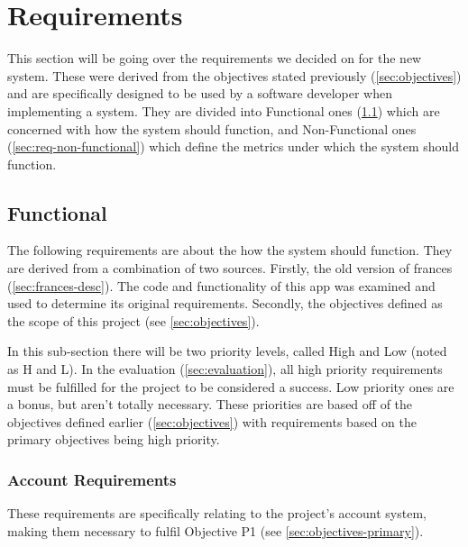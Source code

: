 \documentclass[12pt, letterpaper]{article}
\begin{document}
\section{Requirements}\label{sec:requirements}

\begin{flushleft}
This section will be going over the requirements we decided on for the new system. These were derived from the objectives stated previously (\ref{sec:objectives}) and are specifically designed to be used by a software developer when implementing a system. They are divided into Functional ones (\ref{sec:req-functional}) which are concerned with how the system should function, and Non-Functional ones (\ref{sec:req-non-functional}) which define the metrics under which the system should function.
\end{flushleft}

\subsection{Functional}\label{sec:req-functional}

\begin{flushleft}
The following requirements are about the how the system should function. They are derived from a combination of two sources. Firstly, the old version of frances (\ref{sec:frances-desc}). The code and functionality of this app was examined and used to determine its original requirements. Secondly, the objectives defined as the scope of this project (see \ref{sec:objectives}).
\end{flushleft}

\begin{flushleft}
In this sub-section there will be two priority levels, called High and Low (noted as H and L). In the evaluation (\ref{sec:evaluation}), all high priority requirements must be fulfilled for the project to be considered a success. Low priority ones are a bonus, but aren't totally necessary. These priorities are based off of the objectives defined earlier (\ref{sec:objectives}) with requirements based on the primary objectives being high priority.
\end{flushleft}

\subsubsection{Account Requirements}\label{sec:req-functional-account}

\begin{flushleft}
These requirements are specifically relating to the project's account system, making them necessary to fulfil Objective P1 (see \ref{sec:objectives-primary}).
\end{flushleft}
\end{document}
